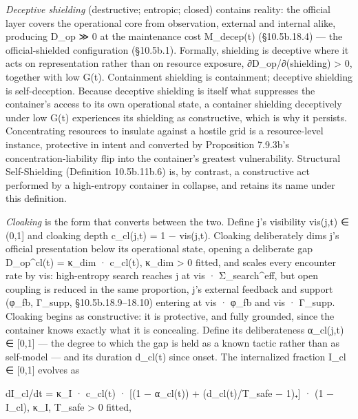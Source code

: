 \documentclass[
]{article}
\begin{document}
\emph{Deceptive shielding} (destructive; entropic; closed) contains
reality: the official layer covers the operational core from
observation, external and internal alike, producing D\_op ≫ 0 at the
maintenance cost M\_decep(t) (§10.5b.18.4) --- the official-shielded
configuration (§10.5b.1). Formally, shielding is deceptive where it acts
on representation rather than on resource exposure, ∂D\_op/∂(shielding)
\textgreater{} 0, together with low G(t). Containment shielding is
containment; deceptive shielding is self-deception. Because deceptive
shielding is itself what suppresses the container's access to its own
operational state, a container shielding deceptively under low G(t)
experiences its shielding as constructive, which is why it persists.
Concentrating resources to insulate against a hostile grid is a
resource-level instance, protective in intent and converted by
Proposition 7.9.3b's concentration-liability flip into the container's
greatest vulnerability. Structural Self-Shielding (Definition
10.5b.11b.6) is, by contrast, a constructive act performed by a
high-entropy container in collapse, and retains its name under this
definition.

\emph{Cloaking} is the form that converts between the two. Define j's
visibility vis(j,t) ∈ (0,1{]} and cloaking depth c\_cl(j,t) = 1 −
vis(j,t). Cloaking deliberately dims j's official presentation below its
operational state, opening a deliberate gap D\_op\^{}cl(t) = κ\_dim ·
c\_cl(t), κ\_dim \textgreater{} 0 fitted, and scales every encounter
rate by vis: high-entropy search reaches j at vis · Σ\_search\^{}eff,
but open coupling is reduced in the same proportion, j's external
feedback and support (φ\_fb, Γ\_supp, §10.5b.18.9--18.10) entering at
vis · φ\_fb and vis · Γ\_supp. Cloaking begins as constructive: it is
protective, and fully grounded, since the container knows exactly what
it is concealing. Define its deliberateness α\_cl(j,t) ∈ {[}0,1{]} ---
the degree to which the gap is held as a known tactic rather than as
self-model --- and its duration d\_cl(t) since onset. The internalized
fraction I\_cl ∈ {[}0,1{]} evolves as

dI\_cl/dt = κ\_I · c\_cl(t) · {[}(1 − α\_cl(t)) + (d\_cl(t)/T\_safe −
1)₊{]} · (1 − I\_cl), κ\_I, T\_safe \textgreater{} 0 fitted,
\end{document}
